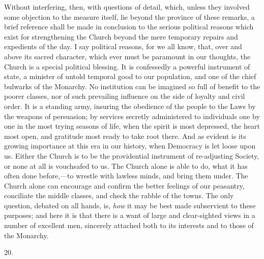 Without interfering, then, with questions of
detail, which, unless they involved some objection to the measure
itself, lie beyond the province of these remarks, a brief reference
shall be made in conclusion to the serious political reasons which
exist for strengthening the Church beyond the mere temporary repairs
and expedients of the day. I say political reasons, for we all know,
that, over and above its sacred character, which ever must be
paramount in our thoughts, the Church is a special political blessing.
It is confessedly a powerful instrument of state, a minister of untold
temporal good to our population, and one of the chief bulwarks of the
Monarchy. No institution can be imagined so full of benefit to the
poorer classes, nor of such prevailing influence on the side of
loyalty and civil order. It is a standing army, insuring the obedience
of the people to the Laws by the weapons of persuasion; by services
secretly administered to individuals one by one in the most trying
seasons of life, when the spirit is most depressed, the heart most
open, and gratitude most ready to take root there. And as evident is
its growing importance at this era in our history, when Democracy is
let loose upon us. Either the Church is to be the providential
instrument of re-adjusting Society, or none at all is vouchsafed to
us. The Church alone is able to do, what it has often done
before,—to wrestle with lawless minds, and bring them under. The
Church alone can encourage and confirm the better feelings of our
peasantry, conciliate the middle classes, and check the rabble of the
towns. The only question, debated on all hands, is, \emph{how} it may be best
made subservient to these purposes; and here it is that there is a
want of large and clear-sighted views in a number of excellent men,
sincerely attached both to its interests and to those of the Monarchy.

20.

